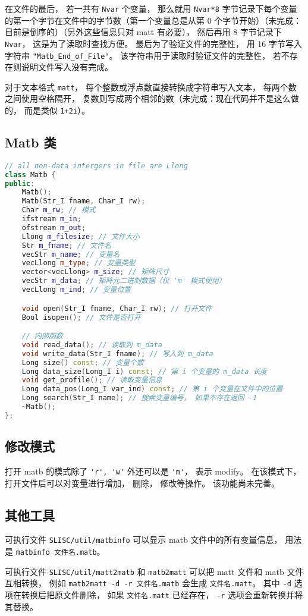 在文件的最后， 若一共有 \verb|Nvar| 个变量， 那么就用 \verb|Nvar*8| 字节记录下每个变量的第一个字节在文件中的字节数（第一个变量总是从第 0 个字节开始）（未完成：目前是倒序的）（另外这些信息只对 matt 有必要）， 然后再用 8 字节记录下 \verb|Nvar|， 这是为了读取时查找方便。 最后为了验证文件的完整性， 用 16 字节写入字符串 \verb|"Matb_End_of_File"|。 该字符串用于读取时验证文件的完整性， 若不存在则说明文件写入没有完成。

对于文本格式 \verb|matt|， 每个整数或浮点数直接转换成字符串写入文本， 每两个数之间使用空格隔开， 复数则写成两个相邻的数（未完成：现在代码并不是这么做的， 而是类似 \verb|1+2i|）。

\subsection{Matb 类}
\begin{lstlisting}[language=cpp]
// all non-data intergers in file are Llong
class Matb {
public:
    Matb();
    Matb(Str_I fname, Char_I rw);
    Char m_rw; // 模式
    ifstream m_in;
    ofstream m_out;
    Llong m_filesize; // 文件大小
    Str m_fname; // 文件名
    vecStr m_name; // 变量名
    vecLlong m_type; // 变量类型
    vector<vecLlong> m_size; // 矩阵尺寸
    vecStr m_data; // 矩阵元二进制数据（仅 'm' 模式使用）
    vecLlong m_ind; // 变量位置

    void open(Str_I fname, Char_I rw); // 打开文件
    Bool isopen(); // 文件是否打开

    // 内部函数
    void read_data(); // 读取到 m_data
    void write_data(Str_I fname); // 写入到 m_data
    Long size() const; // 变量个数
    Long data_size(Long_I i) const; // 第 i 个变量的 m_data 长度
    void get_profile(); // 读取变量信息
    Long data_pos(Long_I var_ind) const; // 第 i 个变量在文件中的位置
    Long search(Str_I name); // 搜索变量编号， 如果不存在返回 -1
    ~Matb();
};
\end{lstlisting}

\subsection{修改模式}
打开 matb 的模式除了 \verb|'r', 'w'| 外还可以是 \verb|'m'|， 表示 modify。 在该模式下， 打开文件后可以对变量进行增加， 删除， 修改等操作。 该功能尚未完善。

\subsection{其他工具}
可执行文件 \verb|SLISC/util/matbinfo| 可以显示 matb 文件中的所有变量信息， 用法是 \verb|matbinfo 文件名.matb|。

可执行文件 \verb|SLISC/util/matt2matb| 和 \verb|matb2matt| 可以把 matt 文件和 matb 文件互相转换， 例如 \verb|matb2matt -d -r 文件名.matb| 会生成 \verb|文件名.matt|。 其中 \verb|-d| 选项在转换后把原文件删除， 如果 \verb|文件名.matt| 已经存在， \verb|-r| 选项会重新转换并将其替换。
